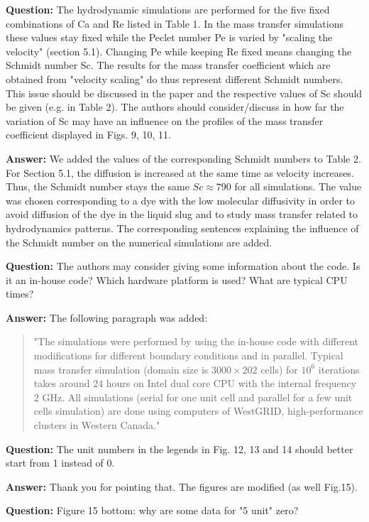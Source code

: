 \documentclass{article}
\begin{document}
\textbf{Question:} The hydrodynamic simulations are performed for the five fixed combinations of Ca and Re listed in Table 1. In the mass transfer simulations these values stay fixed while the Peclet number Pe is varied by "scaling the velocity" (section 5.1). Changing Pe while keeping Re fixed means changing the Schmidt number Sc. The results for the mass transfer coefficient which are obtained from "velocity scaling" do thus represent different Schmidt numbers. This issue should be discussed in the paper and the respective values of Sc should be given (e.g. in Table 2). The authors should consider/discuss in how far the variation of Sc may have an influence on the profiles of the mass transfer coefficient displayed in Figs. 9, 10, 11.

\textbf{Answer:} We added the values of the corresponding Schmidt numbers to Table 2. For Section 5.1, the diffusion is increased at the same time as velocity increases. Thus, the Schmidt number stays the same  $Sc\approx790$ for all simulations. The value was chosen corresponding to a dye with the low molecular diffusivity in order to avoid diffusion of the dye in the liquid slug and to study mass transfer related to hydrodynamics patterns. The corresponding sentences explaining the influence of the Schmidt number on the numerical simulations are added.

\textbf{Question:} The authors may consider giving some information about the code. Is it an in-house code? Which hardware platform is used? What are typical CPU times?

\textbf{Answer:} The following paragraph was added:
\begin{quote}
"The simulations were performed by using the in-house code with different modifications for different boundary conditions and in parallel. Typical mass transfer simulation (domain size is $3000\times202$ cells) for $10^{6}$ iterations takes around $24$ hours on Intel dual core CPU with the internal frequency $2$ GHz. All simulations (serial for one unit cell and parallel for a few unit cells simulation) are done using computers of WestGRID, high-performance clusters in Western Canada."
\end{quote}

\textbf{Question:} The unit numbers in the legends in Fig. 12, 13 and 14 should better start from 1 instead of 0.

\textbf{Answer:} Thank you for pointing that. The figures are modified (as well Fig.15).

\textbf{Question:} Figure 15 bottom: why are some data for "5 unit" zero?
\end{document}
